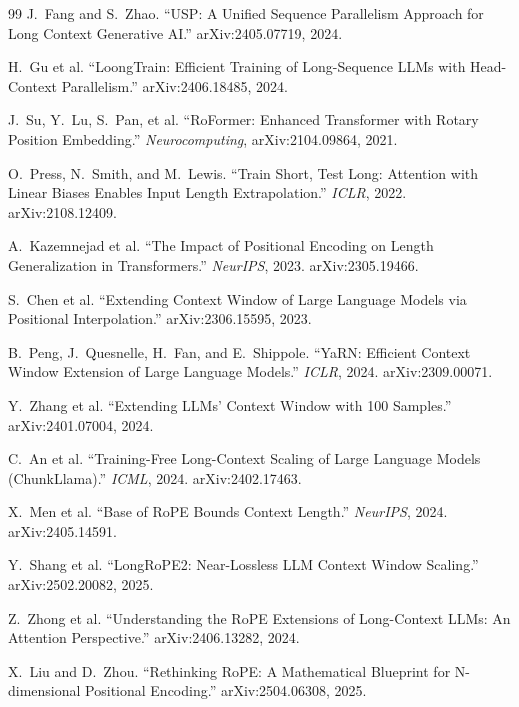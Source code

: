 \documentclass[11pt,a4paper]{article}
\begin{document}
\begin{thebibliography}{99}
 J.~Fang and S.~Zhao.
\newblock ``USP: A Unified Sequence Parallelism Approach for Long Context Generative AI.''
\newblock arXiv:2405.07719, 2024.

 H.~Gu et al.
\newblock ``LoongTrain: Efficient Training of Long-Sequence LLMs with Head-Context Parallelism.''
\newblock arXiv:2406.18485, 2024.

 J.~Su, Y.~Lu, S.~Pan, et al.
\newblock ``RoFormer: Enhanced Transformer with Rotary Position Embedding.''
\newblock \textit{Neurocomputing}, arXiv:2104.09864, 2021.

 O.~Press, N.~Smith, and M.~Lewis.
\newblock ``Train Short, Test Long: Attention with Linear Biases Enables Input Length Extrapolation.''
\newblock \textit{ICLR}, 2022. arXiv:2108.12409.

 A.~Kazemnejad et al.
\newblock ``The Impact of Positional Encoding on Length Generalization in Transformers.''
\newblock \textit{NeurIPS}, 2023. arXiv:2305.19466.

 S.~Chen et al.
\newblock ``Extending Context Window of Large Language Models via Positional Interpolation.''
\newblock arXiv:2306.15595, 2023.

 B.~Peng, J.~Quesnelle, H.~Fan, and E.~Shippole.
\newblock ``YaRN: Efficient Context Window Extension of Large Language Models.''
\newblock \textit{ICLR}, 2024. arXiv:2309.00071.

 Y.~Zhang et al.
\newblock ``Extending LLMs' Context Window with 100 Samples.''
\newblock arXiv:2401.07004, 2024.

 C.~An et al.
\newblock ``Training-Free Long-Context Scaling of Large Language Models (ChunkLlama).''
\newblock \textit{ICML}, 2024. arXiv:2402.17463.

 X.~Men et al.
\newblock ``Base of RoPE Bounds Context Length.''
\newblock \textit{NeurIPS}, 2024. arXiv:2405.14591.

 Y.~Shang et al.
\newblock ``LongRoPE2: Near-Lossless LLM Context Window Scaling.''
\newblock arXiv:2502.20082, 2025.

 Z.~Zhong et al.
\newblock ``Understanding the RoPE Extensions of Long-Context LLMs: An Attention Perspective.''
\newblock arXiv:2406.13282, 2024.

 X.~Liu and D.~Zhou.
\newblock ``Rethinking RoPE: A Mathematical Blueprint for N-dimensional Positional Encoding.''
\newblock arXiv:2504.06308, 2025.


\end{thebibliography}
\end{document}
